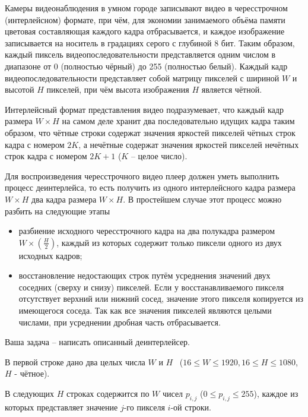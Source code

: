 
Камеры
видеонаблюдения в умном городе записывают видео в чересстрочном (интерлейсном)
формате, при чём, для экономии занимаемого объёма памяти цветовая составляющая
каждого кадра отбрасывается, и каждое изображение записывается на носитель в градациях
серого с глубиной 8 бит. Таким образом, каждый пиксель видеопоследовательности
представляется одним числом в диапазоне от 0 (полностью чёрный) до 255
(полностью белый). Каждый кадр видеопоследовательности представляет собой
матрицу пикселей с шириной $ W $ и высотой $ H $
пикселей, при чём высота изображения $ H $ является чётной.

Интерлейсный
формат представления видео подразумевает, что каждый кадр размера $ W\times H $ на самом деле хранит два
последовательно идущих кадра таким образом, что чётные строки содержат значения
яркостей пикселей чётных строк кадра с номером $ 2K $, а нечётные содержат значения яркостей
пикселей нечётных строк кадра с номером $ 2K+1 $ ($ K $ – целое число).

Для
воспроизведения чересстрочного видео плеер должен уметь выполнить процесс
деинтерлейса, то есть получить из одного интерлейсного кадра размера $  W\times H  $ 
два кадра размера $ W\times H $. В простейшем случае этот
процесс можно разбить на следующие этапы

\begin{itemize}
    \item разбиение исходного чересстрочного кадра на два
    полукадра размером \linebreak $ W\times(\frac{H}{2}) $, каждый из которых
    содержит только пиксели одного из двух исходных кадров;
    \item восстановление недостающих строк путём
    усреднения значений двух соседних (сверху и снизу) пикселей. Если у
    восстанавливаемого пикселя отсутствует верхний или нижний сосед, значение этого
    пикселя копируется из имеющегося соседа. Так как все значения пикселей являются
    целыми числами, при усреднении дробная часть отбрасывается.
\end{itemize}

Ваша задача –
написать описанный деинтерлейсер.


В первой строке
дано два целых числа $ W $ и $H$  ($16 \le W \le 1920, 16 \le H \le 1080$, $H$ -  чётное).

В следующих $ H $ строках содержится по $ W $ чисел $ p_{i,j}$ ($ 0 \le p_{i,j} \le 255 $), каждое из которых представляет значение
$j$-го пикселя $ i $-ой строки.

